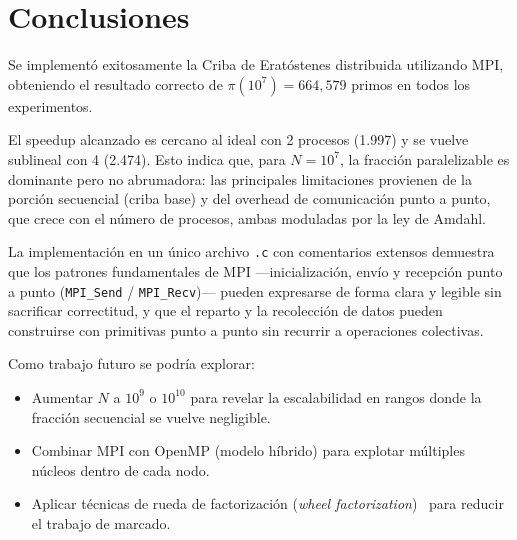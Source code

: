 \documentclass[conference]{IEEEtran}
\begin{document}
\section{Conclusiones}

Se implementó exitosamente la Criba de Eratóstenes distribuida utilizando
MPI, obteniendo el resultado correcto de $\pi(10^7) = 664{,}579$ primos en
todos los experimentos.

El speedup alcanzado es cercano al ideal con 2 procesos (1.997) y se vuelve
sublineal con 4 (2.474). Esto indica que, para $N = 10^7$, la fracción
paralelizable es dominante pero no abrumadora: las principales limitaciones
provienen de la porción secuencial (criba base) y del overhead de comunicación
punto a punto, que crece con el número de procesos, ambas moduladas por la ley
de Amdahl.

La implementación en un único archivo \texttt{.c} con comentarios extensos
demuestra que los patrones fundamentales de MPI —inicialización, envío y
recepción punto a punto (\texttt{MPI\_Send} / \texttt{MPI\_Recv})— pueden
expresarse de forma clara y legible sin sacrificar correctitud, y que el reparto
y la recolección de datos pueden construirse con primitivas punto a punto sin
recurrir a operaciones colectivas.

Como trabajo futuro se podría explorar:
\begin{itemize}
  \item Aumentar $N$ a $10^9$ o $10^{10}$ para revelar la escalabilidad en
        rangos donde la fracción secuencial se vuelve negligible.
  \item Combinar MPI con OpenMP (modelo híbrido) para explotar múltiples
        núcleos dentro de cada nodo.
  \item Aplicar técnicas de rueda de factorización (\textit{wheel
        factorization})~\cite{pritchard1982} para reducir el trabajo de
        marcado.
\end{itemize}
\end{document}
